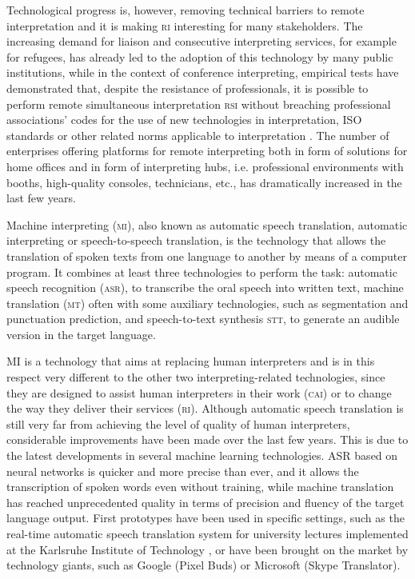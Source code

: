 \documentclass[output=paper]{langsci/langscibook}
\begin{document}
Technological progress is, however, removing technical barriers to remote interpretation and it is making \textsc{ri} interesting for many stakeholders. The increasing demand for liaison and consecutive interpreting services, for example for refugees, has already led to the adoption of this technology by many public institutions, while in the context of conference interpreting, empirical tests have demonstrated that, despite the resistance of professionals, it is possible to perform remote simultaneous interpretation \textsc{rsi} without breaching professional associations’ codes for the use of new technologies in interpretation, ISO standards or other related norms applicable to interpretation \citep[202]{Causo2011b}. The number of enterprises offering platforms for remote interpreting both in form of solutions for home offices and in form of interpreting hubs, i.e. professional environments with booths, high-quality consoles, technicians, etc., has dramatically increased in the last few years.  
 
Machine interpreting (\textsc{mi}), also known as automatic speech translation, automatic interpreting or speech-to-speech translation, is the technology that allows the translation of spoken texts from one language to another by means of a computer program. It combines at least three technologies to perform the task: automatic speech recognition (\textsc{asr}), to transcribe the oral speech into written text, machine translation (\textsc{mt}) often with some auxiliary technologies, such as segmentation and punctuation prediction, and speech-to-text synthesis \textsc{stt}, to generate an audible version in the target language. 
 
MI is a technology that aims at replacing human interpreters and is in this respect very different to the other two interpreting-related technologies, since they are designed to assist human interpreters in their work (\textsc{cai}) or to change the way they deliver their services (\textsc{ri}). Although automatic speech translation is still very far from achieving the level of quality of human interpreters, considerable improvements have been made over the last few years. This is due to the latest developments in several machine learning technologies. \textsc{ASR} based on neural networks is quicker and more precise than ever, and it allows the transcription of spoken words even without training, while machine translation has reached unprecedented quality in terms of precision and fluency of the target language output. First prototypes have been used in specific settings, such as the real-time automatic speech translation system for university lectures implemented at the Karlsruhe Institute of Technology \citep{muller_lecture_2016}, or have been brought on the market by technology giants, such as Google (Pixel Buds) or Microsoft (Skype Translator).  
 
\end{document}
